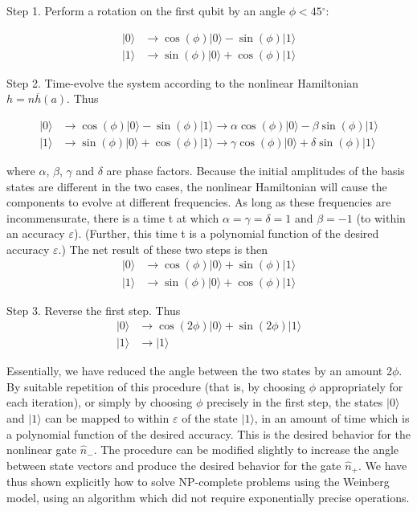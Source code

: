 \documentclass[12pt]{article}
\begin{document}
Step 1. Perform a rotation on the first qubit by an angle $\phi<45{{}^{\circ}}
$:%

\begin{align}
|0\rangle &  \longrightarrow\cos(\phi)|0\rangle-\sin(\phi)|1\rangle\\
|1\rangle &  \longrightarrow\sin(\phi)|0\rangle+\cos(\phi)|1\rangle
\end{align}

Step 2. Time-evolve the system according to the nonlinear Hamiltonian
$h=n\overline{h}(a)$. Thus%

\begin{align}
|0\rangle &  \longrightarrow\cos(\phi)|0\rangle-\sin(\phi)|1\rangle
\longrightarrow\alpha\cos(\phi)|0\rangle-\beta\sin(\phi)|1\rangle\\
|1\rangle &  \longrightarrow\sin(\phi)|0\rangle+\cos(\phi)|1\rangle
\longrightarrow\gamma\cos(\phi)|0\rangle+\delta\sin(\phi)|1\rangle
\end{align}

where $\alpha$, $\beta$, $\gamma$ and $\delta$ are phase factors. Because the
initial amplitudes of the basis states are different in the two cases, the
nonlinear Hamiltonian will cause the components to evolve at different
frequencies. As long as these frequencies are incommensurate, there is a time
t at which $\alpha=\gamma=\delta=1$ and $\beta=-1$ (to within an accuracy
$\varepsilon$). (Further, this time t is a polynomial function of the desired
accuracy $\varepsilon$.) The net result of these two steps is then
\begin{align}
|0\rangle &  \longrightarrow\cos(\phi)|0\rangle+\sin(\phi)|1\rangle\\
|1\rangle &  \longrightarrow\sin(\phi)|0\rangle+\cos(\phi)|1\rangle
\end{align}

Step 3. Reverse the first step. Thus
\begin{align}
|0\rangle &  \longrightarrow\cos(2\phi)|0\rangle+\sin(2\phi)|1\rangle\\
|1\rangle &  \longrightarrow|1\rangle
\end{align}

Essentially, we have reduced the angle between the two states by an amount
2$\phi.$ By suitable repetition of this procedure (that is, by choosing $\phi$
appropriately for each iteration), or simply by choosing $\phi$ precisely in
the first step, the states $\vert 0 \rangle$ and $\vert 1 \rangle$
can be mapped to within $\varepsilon$ of the state $\vert 1 \rangle$, 
in an amount of time which is a polynomial function of the desired accuracy.
This is the desired behavior for the nonlinear gate $\widehat{n}_{-}$. The
procedure can be modified slightly to increase the angle between state vectors
and produce the desired behavior for the gate $\widehat{n}_{+}$. We have thus
shown explicitly how to solve NP-complete problems using the Weinberg model,
using an algorithm which did not require exponentially precise operations.
\end{document}
